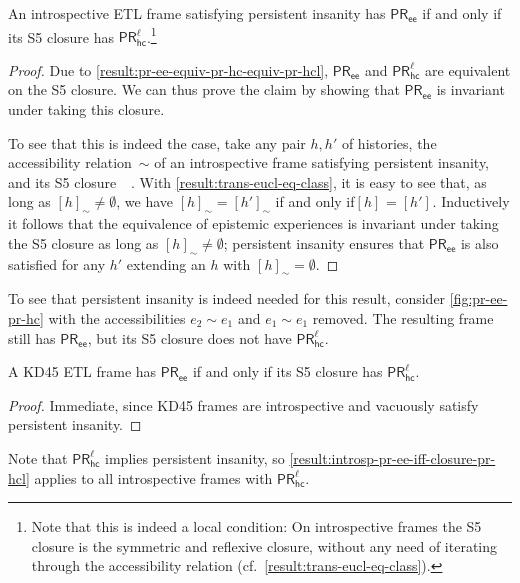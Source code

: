 \documentclass{article}
\newcommand{\PRhcl}{\ensuremath{\mathsf{PR_{hc}^\ell}}\xspace}
\newcommand{\PRee}{\ensuremath{\mathsf{PR_{ee}}}\xspace}
\newcommand{\acc}{\sim}
\DeclareMathOperator{\accSfive}{\dot\acc}
\newcommand{\tiff}{if and only if\xspace}
\newcounter{#1}
\begin{document}
\begin{proposition}
  \label{result:introsp-pr-ee-iff-closure-pr-hcl}
  An introspective ETL frame satisfying persistent insanity has \PRee \tiff its S5 closure has \PRhcl.\footnote{\label{fn:s5-closure-is-local}
    Note that this is indeed a local condition:
    On introspective frames the S5 closure is the symmetric and reflexive closure,
    without any need of iterating through the accessibility relation (cf.~\cref{result:trans-eucl-eq-class}).}
\end{proposition}
\begin{proof}
  Due to \cref{result:pr-ee-equiv-pr-hc-equiv-pr-hcl},
  \PRee and \PRhcl are equivalent on the S5 closure.
  We can thus prove the claim by showing that
  \PRee is invariant under taking this closure.

  To see that this is indeed the case, take any pair $h,h'$ of histories,
  the accessibility relation~$\acc$ of an introspective frame satisfying persistent insanity,
  and its S5 closure~$\accSfive$.
  With \cref{result:trans-eucl-eq-class}, it is easy to see that,
  as long as $[h]_\acc\neq\emptyset$, we have
  $[h]_\acc=[h']_\acc$ \tiff $[h]_{\accSfive}=[h']_{\accSfive}$.
  Inductively it follows that the equivalence of epistemic experiences
  is invariant under taking the S5 closure as long as $[h]_\acc\neq\emptyset$;
  persistent insanity ensures that \PRee is also satisfied for any $h'$
  extending an $h$ with $[h]_\acc=\emptyset$.
\end{proof}

To see that persistent insanity is indeed needed for this result,
consider \cref{fig:pr-ee-pr-hc}
with the accessibilities $e_2\acc e_1$ and $e_1\acc e_1$ removed.
The resulting frame still has \PRee, but its S5 closure does not have \PRhcl.

\begin{corollary}
  A KD45 ETL frame has \PRee \tiff its S5 closure has \PRhcl.
\end{corollary}
\begin{proof}
  Immediate, since KD45 frames are introspective and vacuously satisfy persistent insanity.
\end{proof}

\begin{numberedremark}
  \label{result:pr-hcl-implies-pers-ins}
  Note that \PRhcl implies persistent insanity,
  so \cref{result:introsp-pr-ee-iff-closure-pr-hcl} applies to all introspective frames with \PRhcl.
\end{numberedremark}
\end{document}
